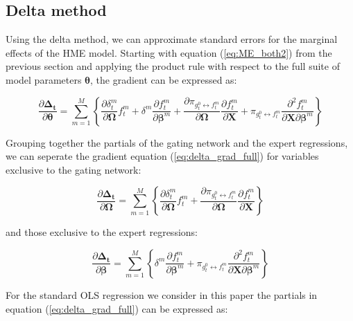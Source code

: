 \documentclass[12pt]{article}
\newcommand{\gateprod}[2]{\pi_{#1 \longleftrightarrow #2}}
\begin{document}
\subsection{Delta method}

Using the delta method, we can approximate standard
errors for the marginal effects of the HME model. Starting with equation
(\ref{eq:ME_both2}) from the previous section and applying the product rule with
respect to the full suite of model parameters $\boldsymbol{\theta}$, the
gradient can be expressed as:

\begin{equation} \label{eq:delta_grad_full}
  \frac{\partial \boldsymbol{\Delta_{t}}}{\partial \boldsymbol{\theta}} = \sum_{m=1}^{M} \left\{   \frac{\partial \delta^{m}_{t}}{\partial \boldsymbol{\Omega}} f^{m}_{t}   +   \delta^{m} \frac{\partial f^{m}_{t}}{\partial \boldsymbol{\beta}^{m}}   +   \frac{\partial \gateprod{g^{0}_{t}}{f^{m}_{t}}}{\partial \boldsymbol{\Omega}} \frac{\partial f^{m}_{t}}{\partial \boldsymbol{X}}    +   \gateprod{g^{0}_{t}}{f^{m}_{t}}  \frac{\partial^{2} f^{m}_{t}}{\partial \boldsymbol{X} \partial \boldsymbol{\beta}^{m}}   \right\}
\end{equation}

Grouping together the partials of the gating network and the expert regressions,
we can seperate the gradient equation (\ref{eq:delta_grad_full}) for
variables exclusive to the gating network:

\begin{equation} \label{eq:delta_grad_gate}
  \frac{\partial \boldsymbol{\Delta_{t}}}{\partial \boldsymbol{\Omega}} = \sum_{m=1}^{M} \left\{   \frac{\partial \delta^{m}_{t}}{\partial \boldsymbol{\Omega}} f^{m}_{t}   +   \frac{\partial \gateprod{g^{0}_{t}}{f^{m}_{t}}}{\partial \boldsymbol{\Omega}} \frac{\partial f^{m}_{t}}{\partial \boldsymbol{X}}  \right\}
\end{equation}

and those exclusive to the expert regressions:

\begin{equation} \label{eq:delta_grad_experts}
  \frac{\partial \boldsymbol{\Delta_{t}}}{\partial \boldsymbol{\beta}} = \sum_{m=1}^{M} \left\{  \delta^{m} \frac{\partial f^{m}_{t}}{\partial \boldsymbol{\beta}^{m}}   +   \gateprod{g^{0}_{t}}{f^{m}_{t}}  \frac{\partial^{2} f^{m}_{t}}{\partial \boldsymbol{X} \partial \boldsymbol{\beta}^{m}}   \right\}
\end{equation}

For the standard OLS regression we consider in this paper the partials in
equation (\ref{eq:delta_grad_full}) can be expressed as:
\end{document}
